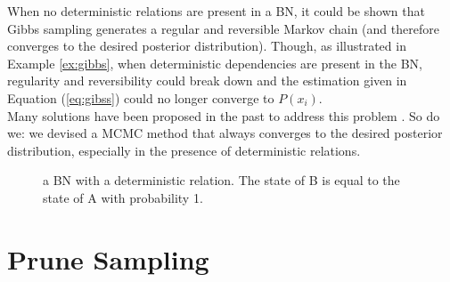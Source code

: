 \documentclass[a4paper, twoside, 11pt]{report}
\theoremstyle{plain}
\theoremstyle{definition}
\theoremstyle{remark}
\begin{document}
When no deterministic relations are present in a BN, it could be shown \cite{poon2006sound} that Gibbs sampling generates a regular and reversible Markov chain (and therefore converges to the desired posterior distribution). Though, as illustrated in Example \ref{ex:gibbs}, when deterministic dependencies are present in the BN, regularity and reversibility could break down and the estimation given in Equation (\ref{eq:gibss}) could no longer converge to $P(x_i)$. \\
Many solutions have been proposed in the past to address this problem \cite{venugopal2013giss, poon2006sound}. So do we: we devised a MCMC method that always converges to the desired posterior distribution, especially in the presence of deterministic relations.
\begin{center}
\begin{figure}[h!]
\centering
{}
\caption{a BN with a deterministic relation. The state of B is equal to the state of A with probability 1.}
\label{gibbs}
\end{figure}
\end{center}


\chapter{Prune Sampling}
\end{document}
